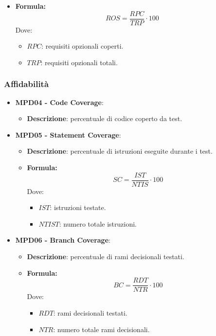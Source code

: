 \documentclass[10pt]{article}
\begin{document}
\begin{justify}
\begin{itemize}
\begin{itemize}
                \item   \textbf{Formula:}
                        \[
                        ROS = \frac{RPC}{TRP} \cdot 100
                        \]
                        Dove:
                        \begin{itemize}
                            \item $RPC$: requisiti opzionali coperti.
                            \item $TRP$: requisiti opzionali totali.
                        \end{itemize}
            \end{itemize}
\end{itemize}

\subsubsection{Affidabilità}
\begin{itemize}
    \item \textbf{MPD04 - Code Coverage}:
    \begin{itemize}
        \item \textbf{Descrizione}: percentuale di codice coperto da test.
    \end{itemize}
    \item \textbf{MPD05 - Statement Coverage}:
    \begin{itemize}
        \item   \textbf{Descrizione}: percentuale di istruzioni eseguite durante i test.
        \item   \textbf{Formula:}
                \[
                SC = \frac{IST}{NTIS} \cdot 100
                \]
                Dove:
                \begin{itemize}
                    \item $IST$: istruzioni testate.
                    \item $NTIST$: numero totale istruzioni.
                \end{itemize}
    \end{itemize}

    \item \textbf{MPD06 - Branch Coverage}:
    \begin{itemize}
        \item   \textbf{Descrizione}: percentuale di rami decisionali testati.
        \item   \textbf{Formula:}
            \[
            BC = \frac{RDT}{NTR} \cdot 100
            \]
            Dove:
            \begin{itemize}
                \item $RDT$: rami decisionali testati.
                \item $NTR$: numero totale rami decisionali.
            \end{itemize}
    \end{itemize}


\end{itemize}
\end{justify}
\end{document}
